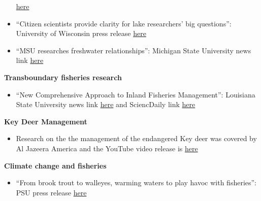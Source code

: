 \documentclass[10pt]{article}
\begin{document}
\begin{flushleft}
\begin{itemize}
\href{http://www.eurekalert.org/pub_releases/2014-04/p-o6y042814.php}{here} \\
\item ``Citizen scientists provide clarity for lake researchers’ big questions'': University of Wisconsin press release
\href{http://www.news.wisc.edu/22805}{here}  \\
\item ``MSU researches freshwater relationships'': Michigan State University news link \href{http://www.statenews.com/index.php/article/2010/06/msu_researches_freshwater_relationships}{here}\\
\vspace{5pt}
\end{itemize}
\textbf{Transboundary fisheries research}\\
\begin{itemize}
\item ``New Comprehensive Approach to Inland Fisheries Management'': Louisiana State University news link \href{http://www.lsu.edu/mediacenter/news/2016/09/13docs_midway_transfish.php}{here} and SciencDaily link \href{https://www.sciencedaily.com/releases/2016/09/160914130706.htm}{here}\\
\end{itemize}
\textbf{Key Deer Management}\\
\begin{itemize}
\vspace{5pt}
\item Research on the the management of the endangered Key deer was covered by Al Jazeera America and the YouTube video release is \href{http://www.youtube.com/watch?v=r6GX7tZiPFk}{here}\\
\vspace{5pt}
\end{itemize}
\textbf{Climate change and fisheries}\\
\begin{itemize}
\vspace{5pt}
\item ``From brook trout to walleyes, warming waters to play havoc with fisheries'': PSU press release \href{http://news.psu.edu/story/470451/2017/06/04/research/brook-trout-walleyes-warming-waters-play-havoc-fisheries}{here}\\
\vspace{5pt}
\end{itemize}


\end{flushleft}
\end{document}
